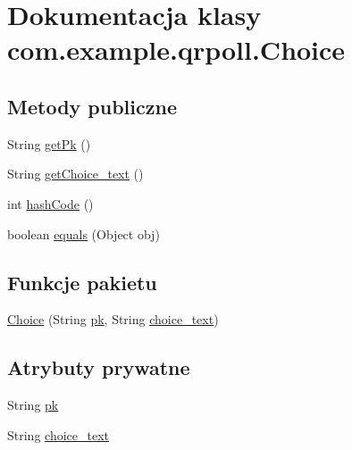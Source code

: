 \hypertarget{classcom_1_1example_1_1qrpoll_1_1_choice}{\section{Dokumentacja klasy com.\+example.\+qrpoll.\+Choice}
\label{classcom_1_1example_1_1qrpoll_1_1_choice}
}
\subsection*{Metody publiczne}
\begin{DoxyCompactItemize}
\item 
String \hyperlink{classcom_1_1example_1_1qrpoll_1_1_choice_a2baa8eb7cc3e3704f754f7617f37acb8}{get\+Pk} ()
\item 
String \hyperlink{classcom_1_1example_1_1qrpoll_1_1_choice_a8484f80a3cf1b34172b435eb4bc64df7}{get\+Choice\+\_\+text} ()
\item 
int \hyperlink{classcom_1_1example_1_1qrpoll_1_1_choice_a748824dd96616a7dde38645bd80c8faa}{hash\+Code} ()
\item 
boolean \hyperlink{classcom_1_1example_1_1qrpoll_1_1_choice_ad4e5a0f7bb62a19e63fc4600e6d16c67}{equals} (Object obj)
\end{DoxyCompactItemize}
\subsection*{Funkcje pakietu}
\begin{DoxyCompactItemize}
\item 
\hyperlink{classcom_1_1example_1_1qrpoll_1_1_choice_a66024b291117e1d6986ee90f836fd208}{Choice} (String \hyperlink{classcom_1_1example_1_1qrpoll_1_1_choice_a6213ee79d3a08c00ca588b9813b7e912}{pk}, String \hyperlink{classcom_1_1example_1_1qrpoll_1_1_choice_ab336c2005a764a1d28450c206eeb4ed0}{choice\+\_\+text})
\end{DoxyCompactItemize}
\subsection*{Atrybuty prywatne}
\begin{DoxyCompactItemize}
\item 
String \hyperlink{classcom_1_1example_1_1qrpoll_1_1_choice_a6213ee79d3a08c00ca588b9813b7e912}{pk}
\item 
String \hyperlink{classcom_1_1example_1_1qrpoll_1_1_choice_ab336c2005a764a1d28450c206eeb4ed0}{choice\+\_\+text}
\end{DoxyCompactItemize}


